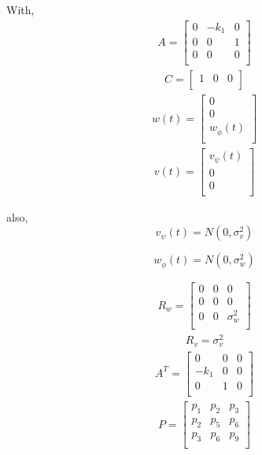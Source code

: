 \documentclass[paper=a4, fontsize=11pt]{scrartcl}
\numberwithin{equation}{section}		%
\numberwithin{figure}{section}			%
\numberwithin{table}{section}				%
\begin{document}
With,
\begin{align*}
A=
\begin{bmatrix}
0& -k_1 &0\\
0 &0& 1\\
0 &0& 0\\
\end{bmatrix}
\end{align*}
\begin{align*}
C=
\begin{bmatrix}
1& 0 &0\\
\end{bmatrix}
\end{align*}
\begin{align*}
w(t)=
\begin{bmatrix}
0\\
0\\
w_{\dot{\phi}}(t)\\
\end{bmatrix}
\end{align*}
\begin{align*}
v(t)=
\begin{bmatrix}
v_{\psi}(t)\\
0\\
0\\
\end{bmatrix}
\end{align*}

also, \\
$$v_{\psi}(t) = N(0,\sigma_v^2)$$ 

$$w_{\dot{\phi}}(t) = N(0,\sigma_w^2)$$

\begin{align*}
R_w=
\begin{bmatrix}
0 & 0 & 0\\
0 & 0 & 0\\
0 & 0 & \sigma_w^2 \\
\end{bmatrix}
\end{align*}
\begin{align*}
R_v=\sigma_v^2
\end{align*}
\begin{align*}
A^T=
\begin{bmatrix}
0 & 0 & 0\\
-k_1 & 0 & 0\\
0 & 1 & 0 \\
\end{bmatrix}
\end{align*}
\begin{align*}
P=
\begin{bmatrix}
p_1 & p_2 & p_3\\
p_2 & p_5 & p_6\\
p_3 & p_6 & p_9 \\
\end{bmatrix}
\end{align*}
\end{document}
